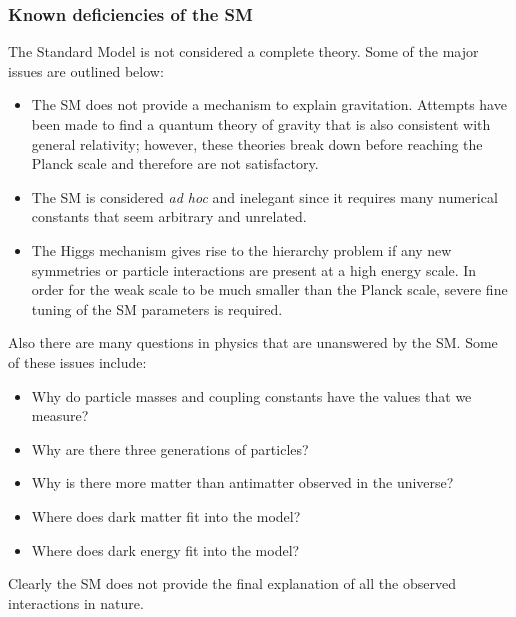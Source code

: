 \subsubsection{Known deficiencies of the SM}
\label{sec:intro_sm_issues}
The Standard Model is not considered a complete theory. Some of the major
issues are outlined below:
\begin{itemize}
\item The SM does not provide a mechanism to explain gravitation. Attempts have
been made to find a quantum theory of gravity that is also consistent with
general relativity; however, these theories break down before reaching the
Planck scale and therefore are not satisfactory.
\item The SM is considered {\it ad hoc} and inelegant since it requires many
numerical constants that seem arbitrary and unrelated.
\item The Higgs mechanism gives rise to the hierarchy problem if any new
symmetries or particle interactions are present at a high energy scale. In
order for the weak scale to be much smaller than the Planck scale, severe fine
tuning of the SM parameters is required.
\end{itemize}
Also there are many questions in physics that are unanswered by the SM. Some of
these issues include:
\begin{itemize}
\item Why do particle masses and coupling constants have the values that we measure?
\item Why are there three generations of particles?
\item Why is there more matter than antimatter observed in the universe?
\item Where does dark matter fit into the model?
\item Where does dark energy fit into the model?
\end{itemize}
Clearly the SM does not provide the final explanation of all the observed
interactions in nature.

